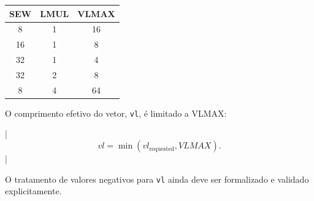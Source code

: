 \begin{center}
\begin{tabular}{ccc}
\toprule
SEW & LMUL & VLMAX \\
\midrule
8  & 1 & 16 \\
16 & 1 & 8 \\
32 & 1 & 4 \\
32 & 2 & 8 \\
8  & 4 & 64 \\
\bottomrule
\end{tabular}
\end{center}

O comprimento efetivo do vetor, \texttt{vl}, é limitado a VLMAX:

|$$
vl = \min(vl_{\text{requested}}, VLMAX).
$$|

O tratamento de valores negativos para \texttt{vl} ainda deve ser
formalizado e validado explicitamente.